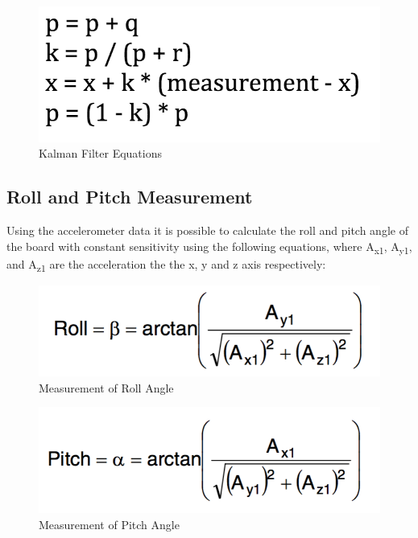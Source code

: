 \documentclass[12pt]{article}
\begin{document}
\begin{figure}[!htb]
 \centering
 \includegraphics[scale=0.50]{images/kalman.png}
 \caption{Kalman Filter Equations}
 \label{fig:kalman}
\end{figure}

\subsection{Roll and Pitch Measurement}
Using the accelerometer data it is possible to calculate the roll and pitch angle of the board with constant sensitivity using the following equations, where A\textsubscript{x1}, A\textsubscript{y1}, and A\textsubscript{z1} are the acceleration the the x, y and z axis respectively:



\begin{figure}[!htb]
 \centering
 \includegraphics[scale=0.50]{images/roll.png}
 \caption{Measurement of Roll Angle}
 \label{fig:roll}
\end{figure}

\begin{figure}[!htb]
 \centering
 \includegraphics[scale=0.50]{images/pitch.png}
 \caption{Measurement of Pitch Angle}
 \label{fig:pitch}
\end{figure}
\end{document}
